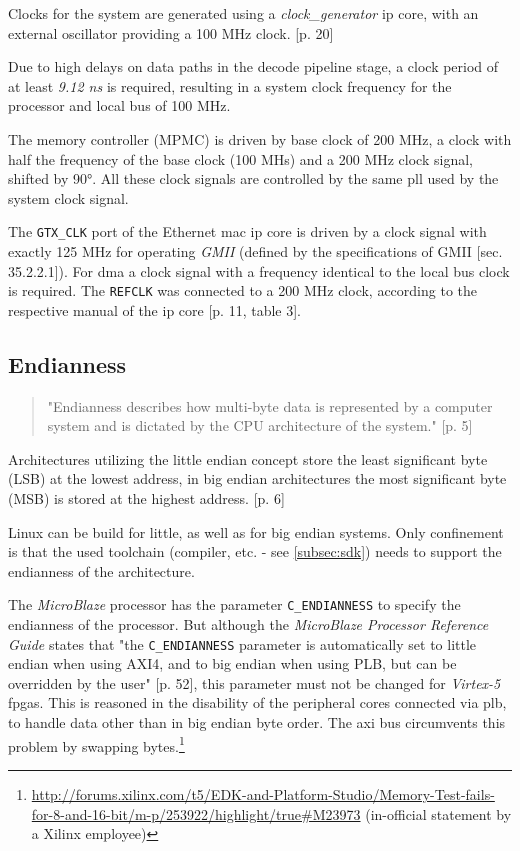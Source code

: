 Clocks for the system are generated using a \textit{clock\_generator} \gls{ip} core, with an external oscillator providing a 100 MHz clock. \cite{ug347}[p. 20]

Due to high delays on data paths in the decode pipeline stage, a clock period of at least \textit{9.12 ns} is required, resulting in a system clock frequency for the processor and local bus of 100 MHz.

The memory controller (MPMC) is driven by base clock of 200 MHz, a clock with half the frequency of the base clock (100 MHs) and a 200 MHz clock signal, shifted by 90°. All these clock signals are controlled by the same \gls{pll} used by the system clock signal.

The \texttt{GTX\_CLK} port of the Ethernet \gls{mac} \gls{ip} core is driven by a clock signal with exactly 125 MHz for operating \textit{GMII} (defined by the specifications of GMII \cite{ieee802_3}[sec. 35.2.2.1]). For \gls{dma} a clock signal with a frequency identical to the local bus clock is required. The \texttt{REFCLK} was connected to a 200 MHz clock, according to the respective manual of the \gls{ip} core \cite{xps_ll_temac}[p. 11, table 3].

\subsection{Endianness}

\begin{quote}
 "Endianness describes how multi-byte data is represented by a computer system and is dictated by the CPU architecture of the system." \cite{intel_endiannness}[p. 5]
\end{quote}

Architectures utilizing the little endian concept store the least significant byte (LSB) at the lowest address, in big endian architectures the most significant byte (MSB) is stored at the highest address. \cite{intel_endiannness}[p. 6]

Linux can be build for little, as well as for big endian systems. Only confinement is that the used toolchain (compiler, etc. - see \ref{subsec:sdk}) needs to support the endianness of the architecture.

The \textit{MicroBlaze} processor has the parameter \texttt{C\_ENDIANNESS} to specify the endianness of the processor. But although the \textit{MicroBlaze Processor Reference Guide} states that "the \texttt{C\_ENDIANNESS} parameter is automatically set to little endian when using AXI4, and to big endian when using PLB, but can be overridden by the user" \cite{mb_ref}[p. 52], this parameter must not be changed for \textit{Virtex-5} \gls{fpga}s. This is reasoned in the disability of the peripheral cores connected via \gls{plb}, to handle data other than in big endian byte order. The \gls{axi} bus circumvents this problem by swapping bytes.\footnote{\url{http://forums.xilinx.com/t5/EDK-and-Platform-Studio/Memory-Test-fails-for-8-and-16-bit/m-p/253922/highlight/true\#M23973} (in-official statement by a Xilinx employee)}

